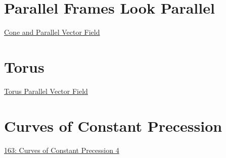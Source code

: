 \documentclass{ximera}
\begin{document}
\section*{Parallel Frames Look Parallel}

\begin{exploration}
\begin{onlineOnly}
    \begin{center}
\end{center}
\end{onlineOnly}

\href{https://www.desmos.com/3d/jzp8zemhz6}{Cone and Parallel Vector Field}
\end{exploration}




\section*{Torus}

\begin{exploration}
\begin{onlineOnly}
    \begin{center}
\end{center}
\end{onlineOnly}

\href{https://www.desmos.com/3d/pkd5ztemml}{Torus Parallel Vector Field}
\end{exploration}



\section*{Curves of Constant Precession}

\begin{exploration}
\begin{onlineOnly}
    \begin{center}
\end{center}
\end{onlineOnly}

\href{https://www.desmos.com/3d/nsifyzlx3p}{163: Curves of Constant Precession 4}
\end{exploration}
\end{document}
